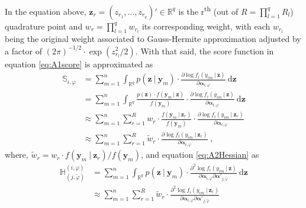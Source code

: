 \documentclass[11pt, a4paper]{article}
\newcommand{\R}{{\ensuremath{\mathbb{R}}}}
\newcommand{\cond}{\!~|~\!}
\begin{document}
In the equation above, $\mathbf{z}_r = (z_{r_1},..., z_{r_q})' \in \R^q$ is the r\textsuperscript{th} (out of $R = \prod_{l = 1}^q R_{l}$) quadrature point and $w_r = \prod_{l=1}^q w_{r_l}$ its corresponding weight, with each $w_{r_l}$ being the original weight associated to Gauss-Hermite approximation adjusted by a factor of $(2\pi)^{-1/2} \cdot \exp(z_{r_l}^2/2)$. With that said, the score function in equation \eqref{eq:A1score} is approximated as
\begin{align*}
\mathbb{S}_{i,\varphi} & = \sum\limits_{m=1}^{n} \int_{\R^q} p(\mathbf{z} \cond \mathbf{y}_m) \cdot \frac{\partial \log f_i(y_{im} \cond \mathbf{z})}{ \partial \bm{\alpha}_{i,\varphi}} ~ \text{d}\mathbf{z} \\[3mm]
& = \sum\limits_{m=1}^{n} \int_{\R^q} \frac{p(\mathbf{z}) \cdot f(\mathbf{y}_m \cond \mathbf{z})}{f(\mathbf{y}_m)} \cdot \frac{\partial \log f_i(y_{im} \cond \mathbf{z})}{\partial \bm{\alpha}_{i,\varphi}} ~ \text{d}\mathbf{z} \\[3mm]
& \approx \sum\limits_{m=1}^{n} \sum\limits_{r=1}^{R} w_r \cdot \frac{f(\mathbf{y}_m \cond \mathbf{z}_r)}{f(\mathbf{y}_m)} \cdot \frac{\partial \log f_i(y_{im} \cond \mathbf{z}_r)}{\partial \bm{\alpha}_{i,\varphi}} \\[3mm]
& \approx \sum\limits_{m=1}^{n} \sum\limits_{r=1}^{R} \tilde{w}_r \cdot \frac{\partial \log f_i(y_{im} \cond \mathbf{z}_r)}{ \partial \bm{\alpha}_{i,\varphi}}~,
\end{align*}
where, $\tilde{w}_r = w_r \cdot f(\mathbf{y}_m \cond \mathbf{z}_r) / f(\mathbf{y}_m)$, and equation \eqref{eq:A2Hessian} as
\begin{align*}
\mathbb{H}_{(j,\tilde{\varphi})}^{(i,\varphi)} & = \sum\limits_{m=1}^{n} \int_{\R^q} p(\mathbf{z} \cond \mathbf{y}_m) \cdot \frac{\partial^2 \log f_i(y_{im} \cond \mathbf{z})}{\partial \bm{\alpha}_{i,\varphi} \partial \bm{\alpha}'_{j,\tilde{\varphi}}} ~ \text{d}\mathbf{z} \\[3mm]
& \approx \sum\limits_{m=1}^{n} \sum\limits_{r=1}^{R}  \tilde{w}_r \cdot \frac{\partial^2 \log f_i(y_{im} \cond \mathbf{z}_r)}{\partial \bm{\alpha}_{i,\varphi} \partial \bm{\alpha}'_{j,\tilde{\varphi}}}
\end{align*}
\end{document}
